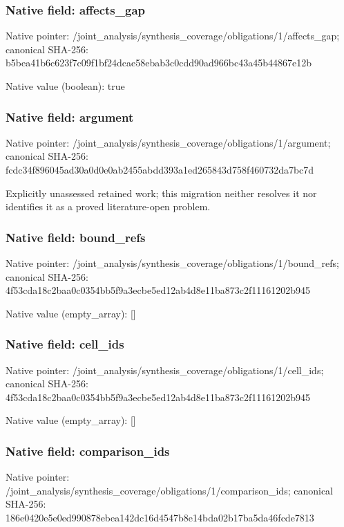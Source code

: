 \documentclass[10pt,a4paper]{article}
\begin{document}
\subsubsection{Native field: affects\_\allowbreak{}gap}
Native pointer: /joint\_\allowbreak{}analysis/synthesis\_\allowbreak{}coverage/obligations/1/affects\_\allowbreak{}gap; canonical SHA-256: b5bea41b6c623f7c09f1bf24dcae58ebab3c0cdd90ad966bc43a45b44867e12b

Native value (boolean): true

\subsubsection{Native field: argument}
Native pointer: /joint\_\allowbreak{}analysis/synthesis\_\allowbreak{}coverage/obligations/1/argument; canonical SHA-256: fcdc34f896045ad30a0d0e0ab2455abdd393a1ed265843d758f460732da7bc7d

\begingroup\raggedright\sloppy Explicitly unassessed retained work;\allowbreak{} this migration neither resolves it nor identifies it as a proved literature-open problem.\par\endgroup

\subsubsection{Native field: bound\_\allowbreak{}refs}
Native pointer: /joint\_\allowbreak{}analysis/synthesis\_\allowbreak{}coverage/obligations/1/bound\_\allowbreak{}refs; canonical SHA-256: 4f53cda18c2baa0c0354bb5f9a3ecbe5ed12ab4d8e11ba873c2f11161202b945

Native value (empty\_\allowbreak{}array): []

\subsubsection{Native field: cell\_\allowbreak{}ids}
Native pointer: /joint\_\allowbreak{}analysis/synthesis\_\allowbreak{}coverage/obligations/1/cell\_\allowbreak{}ids; canonical SHA-256: 4f53cda18c2baa0c0354bb5f9a3ecbe5ed12ab4d8e11ba873c2f11161202b945

Native value (empty\_\allowbreak{}array): []

\subsubsection{Native field: comparison\_\allowbreak{}ids}
Native pointer: /joint\_\allowbreak{}analysis/synthesis\_\allowbreak{}coverage/obligations/1/comparison\_\allowbreak{}ids; canonical SHA-256: 186e0420e5e0ed990878ebea142dc16d4547b8e14bda02b17ba5da46fcde7813
\end{document}

